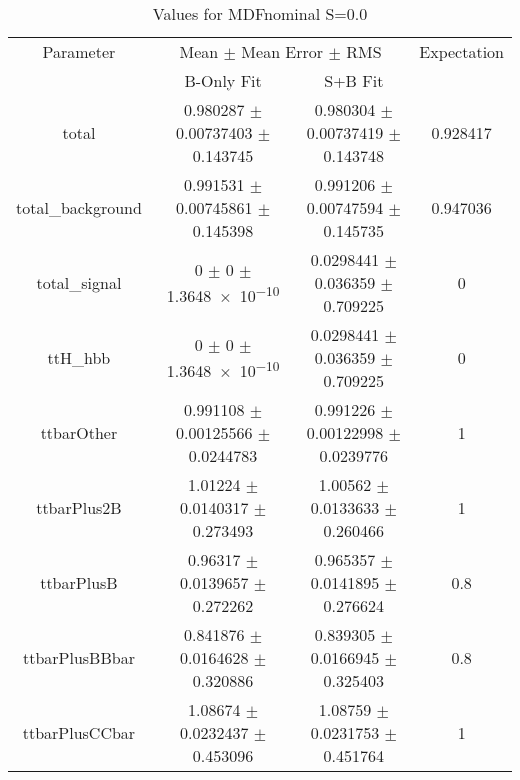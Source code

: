 \begin{table}
\centering
\caption{Values for MDFnominal S=0.0}
\begin{tabular}{cccc}
\toprule
Parameter & \multicolumn{2}{c}{Mean $\pm$ Mean Error $\pm$ RMS} & Expectation\\
 & B-Only Fit & S+B Fit & \\
\midrule
total & \num{0.980287} $\pm$ \num{0.00737403} $\pm$ \num{0.143745} & \num{0.980304} $\pm$ \num{0.00737419} $\pm$ \num{0.143748} & \num{0.928417}\\
total\_background & \num{0.991531} $\pm$ \num{0.00745861} $\pm$ \num{0.145398} & \num{0.991206} $\pm$ \num{0.00747594} $\pm$ \num{0.145735} & \num{0.947036}\\
total\_signal & \num{0} $\pm$ \num{0} $\pm$ \num{1.3648e-10} & \num{0.0298441} $\pm$ \num{0.036359} $\pm$ \num{0.709225} & \num{0}\\
ttH\_hbb & \num{0} $\pm$ \num{0} $\pm$ \num{1.3648e-10} & \num{0.0298441} $\pm$ \num{0.036359} $\pm$ \num{0.709225} & \num{0}\\
ttbarOther & \num{0.991108} $\pm$ \num{0.00125566} $\pm$ \num{0.0244783} & \num{0.991226} $\pm$ \num{0.00122998} $\pm$ \num{0.0239776} & \num{1}\\
ttbarPlus2B & \num{1.01224} $\pm$ \num{0.0140317} $\pm$ \num{0.273493} & \num{1.00562} $\pm$ \num{0.0133633} $\pm$ \num{0.260466} & \num{1}\\
ttbarPlusB & \num{0.96317} $\pm$ \num{0.0139657} $\pm$ \num{0.272262} & \num{0.965357} $\pm$ \num{0.0141895} $\pm$ \num{0.276624} & \num{0.8}\\
ttbarPlusBBbar & \num{0.841876} $\pm$ \num{0.0164628} $\pm$ \num{0.320886} & \num{0.839305} $\pm$ \num{0.0166945} $\pm$ \num{0.325403} & \num{0.8}\\
ttbarPlusCCbar & \num{1.08674} $\pm$ \num{0.0232437} $\pm$ \num{0.453096} & \num{1.08759} $\pm$ \num{0.0231753} $\pm$ \num{0.451764} & \num{1}\\
\bottomrule
\end{tabular}
\end{table}